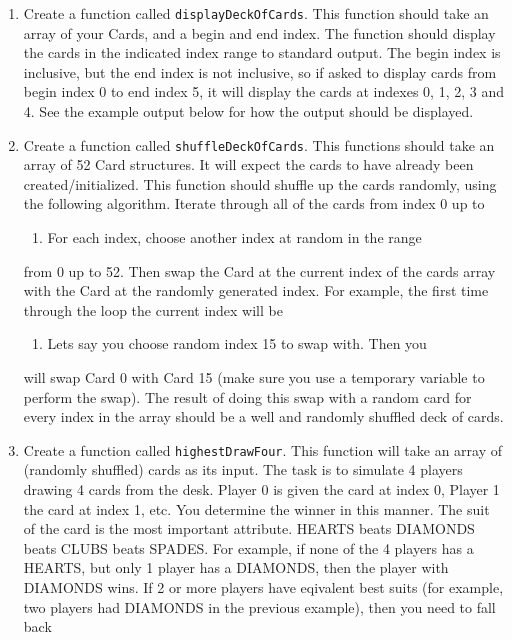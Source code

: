 \documentclass[11pt]{article}
\begin{document}
\begin{enumerate}
\item Create a function called \verb~displayDeckOfCards~.  This function
   should take an array of your Cards, and a begin and end index.  The
   function should display the cards in the indicated index range to
   standard output.  The begin index is inclusive, but the end index
   is not inclusive, so if asked to display cards from begin index 0
   to end index 5, it will display the cards at indexes 0, 1, 2, 3
   and 4.  See the example output below for how the output should be
   displayed.
\item Create a function called \verb~shuffleDeckOfCards~.  This functions
   should take an array of 52 Card structures.  It will expect
   the cards to have already been created/initialized.  This function
   should shuffle up the cards randomly, using the following
   algorithm.  Iterate through all of the cards from index 0 up to
\begin{enumerate}
\item For each index, choose another index at random in the range
\end{enumerate}
from 0 up to 52.  Then swap the Card at the current index of the
   cards array with the Card at the randomly generated index.  For
   example, the first time through the loop the current index will be
\begin{enumerate}
\item Lets say you choose random index 15 to swap with.  Then you
\end{enumerate}
will swap Card 0 with Card 15 (make sure you use a temporary
   variable to perform the swap).  The result of doing this swap with
   a random card for every index in the array should be a well and
   randomly shuffled deck of cards.
\item Create a function called \verb~highestDrawFour~.  This function will
   take an array of (randomly shuffled) cards as its input.  The
   task is to simulate 4 players drawing 4 cards from the desk.  
   Player 0 is given the card at index 0, Player 1 the card at
   index 1, etc.  You determine the winner in this manner.  The
   suit of the card is the most important attribute.  
   HEARTS beats DIAMONDS beats CLUBS beats SPADES.  For example,
   if none of the 4 players has a HEARTS, but only 1 player has
   a DIAMONDS, then the player with DIAMONDS wins.  If 2 or more
   players have eqivalent best suits (for example, two players had
   DIAMONDS in the previous example), then you need to fall back

\end{enumerate}
\end{document}
